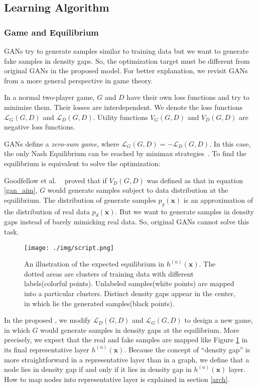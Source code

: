  



\subsection{Learning Algorithm}
\subsubsection{Game and Equilibrium}
GANs try to generate samples similar to training data but we want to generate fake samples in density gaps. So, the optimization target must be different from original GANs in the proposed \smodel model. For better explanation, we revisit GANs from a more general perspective in game theory.

In a normal two-player game, $G$ and $D$ have their own loss functions and try to minimize them. Their losses are interdependent. We denote the loss functions $\mathcal{L}_G(G, D)$ and $\mathcal{L}_D(G, D)$. Utility functions $V_G(G,D)$ and $V_D(G, D)$ are negative loss functions.
	
GANs define a \emph{zero-sum game}, where $\mathcal{L}_G(G, D) = -\mathcal{L}_D(G, D)$. In this case, the only Nash Equilibrium can be reached by minimax strategies~\cite{von2007theory}. To find the equilibrium is equivalent to solve the optimization:
    
Goodfellow et al. ~\cite{goodfellow2014generative} proved that if $V_D(G,D)$ was defined as that in equation \ref{gan_aim}, $G$ would generate samples subject to data distribution at the equilibrium. The distribution of generate samples $p_g(\mathbf{x})$ is an approximation of the distribution of real data $p_d(\mathbf{x})$. But we want to generate samples in density gaps instead of barely mimicking real data. So, original GANs cannot solve this task.



\begin{figure}[t]
\texttt{[image: ./img/script.png]}
\caption{An illustration of the expected equilibrium in $h^{(n)}(\mathbf{x})$. The dotted areas are clusters of training data with different labels(colorful points). Unlabeled samples(white points) are mapped into a particular clusters. Distinct density gaps appear in the center, in which lie the generated samples(black points).}\label{expected}
\end{figure}

In the proposed \model, we modify $\mathcal{L}_D(G, D)$ and $\mathcal{L}_G(G, D)$ to design a new game, in which $G$ would generate samples in density gaps at the equilibrium. More precisely, we expect that the real and fake samples are mapped like Figure \ref{expected} in its final representative layer $h^{(n)}(\mathbf{x})$. Because the concept of ``density gap'' is more straightforward in a representative layer than in a graph, we define that a node lies in density gap if and only if it lies in density gap in $h^{(n)}(\mathbf{x})$ layer. How to map nodes into representative layer is explained in section \ref{arch}.

